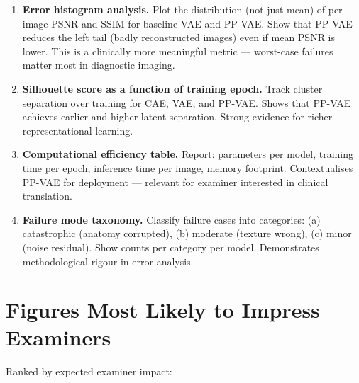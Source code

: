 \documentclass[12pt, a4paper]{article}
\begin{document}
\begin{enumerate}
\item \textbf{Error histogram analysis.}
Plot the distribution (not just mean) of per-image PSNR and SSIM
for baseline VAE and PP-VAE. Show that PP-VAE reduces the
left tail (badly reconstructed images) even if mean PSNR is lower.
This is a clinically more meaningful metric — worst-case failures
matter most in diagnostic imaging.

\item \textbf{Silhouette score as a function of training epoch.}
Track cluster separation over training for CAE, VAE, and PP-VAE.
Shows that PP-VAE achieves earlier and higher latent separation.
Strong evidence for richer representational learning.

\item \textbf{Computational efficiency table.}
Report: parameters per model, training time per epoch, inference
time per image, memory footprint. Contextualises PP-VAE for
deployment — relevant for examiner interested in clinical translation.

\item \textbf{Failure mode taxonomy.}
Classify failure cases into categories: (a) catastrophic (anatomy
corrupted), (b) moderate (texture wrong), (c) minor (noise
residual). Show counts per category per model. Demonstrates
methodological rigour in error analysis.

\end{enumerate}

\section{Figures Most Likely to Impress Examiners}

\noindent Ranked by expected examiner impact:
\end{document}
